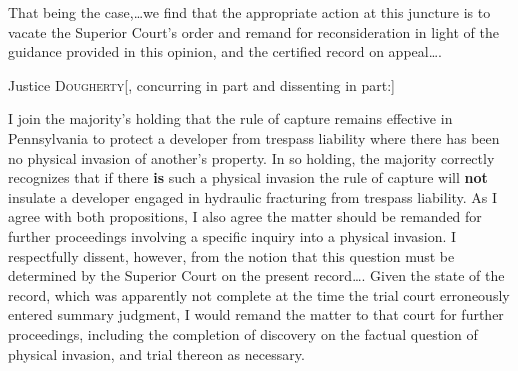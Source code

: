 That being the case,\ldots we find that the appropriate action at this juncture
is to vacate the Superior Court's order and remand for reconsideration in light
of the guidance provided in this opinion, and the certified record on
appeal\ldots .

\opinion Justice \textsc{Dougherty}[, concurring in part and dissenting in
part:]

I join the majority's holding that the rule of capture remains effective in
Pennsylvania to protect a developer from trespass liability where there has been
no physical invasion of another's property. In so holding, the majority
correctly recognizes that if there \textbf{is} such a physical invasion the rule
of capture will \textbf{not} insulate a developer engaged in hydraulic
fracturing from trespass liability. As I agree with both propositions, I also
agree the matter should be remanded for further proceedings involving a specific
inquiry into a physical invasion. I respectfully dissent, however, from the
notion that this question must be determined by the Superior Court on the
present record\ldots . Given the state of the record, which was apparently not
complete at the time the trial court erroneously entered summary judgment, I
would remand the matter to that court for further proceedings, including the
completion of discovery on the factual question of physical invasion, and trial
thereon as necessary.

